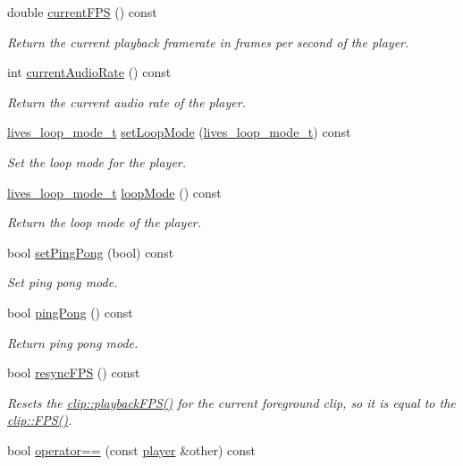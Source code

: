 \begin{DoxyCompactItemize}
double \hyperlink{classlives_1_1player_a3b9a8d1de1a410347fe747c951015e08}{current\-F\-P\-S} () const 
\begin{DoxyCompactList}\small\item\em Return the current playback framerate in frames per second of the player. \end{DoxyCompactList}\item 
int \hyperlink{classlives_1_1player_aa8795d8fab78fd6a4858bbb8ad70ddf3}{current\-Audio\-Rate} () const 
\begin{DoxyCompactList}\small\item\em Return the current audio rate of the player. \end{DoxyCompactList}\item 
\hyperlink{liblives_8hpp_ac271a064408719bb65e09fb6e48040bd}{lives\-\_\-loop\-\_\-mode\-\_\-t} \hyperlink{classlives_1_1player_ab6f98e998e38bd6fe1eeeb0d0136a342}{set\-Loop\-Mode} (\hyperlink{liblives_8hpp_ac271a064408719bb65e09fb6e48040bd}{lives\-\_\-loop\-\_\-mode\-\_\-t}) const 
\begin{DoxyCompactList}\small\item\em Set the loop mode for the player. \end{DoxyCompactList}\item 
\hyperlink{liblives_8hpp_ac271a064408719bb65e09fb6e48040bd}{lives\-\_\-loop\-\_\-mode\-\_\-t} \hyperlink{classlives_1_1player_a9f809e338456fbd7f8064fb7c8af3a32}{loop\-Mode} () const 
\begin{DoxyCompactList}\small\item\em Return the loop mode of the player. \end{DoxyCompactList}\item 
bool \hyperlink{classlives_1_1player_ae69e65632d1f4a786a6d73fea1b88cb2}{set\-Ping\-Pong} (bool) const 
\begin{DoxyCompactList}\small\item\em Set ping pong mode. \end{DoxyCompactList}\item 
bool \hyperlink{classlives_1_1player_acc7431e1884df72092603bbc2651a482}{ping\-Pong} () const 
\begin{DoxyCompactList}\small\item\em Return ping pong mode. \end{DoxyCompactList}\item 
bool \hyperlink{classlives_1_1player_a57021bacac264faa823de1f91ecb48eb}{resync\-F\-P\-S} () const 
\begin{DoxyCompactList}\small\item\em Resets the \hyperlink{classlives_1_1clip_ac1ac02deaaa685277b02b20363a6335a}{clip\-::playback\-F\-P\-S()} for the current foreground clip, so it is equal to the \hyperlink{classlives_1_1clip_aa05a99708f06d6718fee8621a621f894}{clip\-::\-F\-P\-S()}. \end{DoxyCompactList}\item 
bool \hyperlink{classlives_1_1player_a87a5f57284378ad2a17b9e8d9f4120e3}{operator==} (const \hyperlink{classlives_1_1player}{player} \&other) const 
\end{DoxyCompactItemize}
